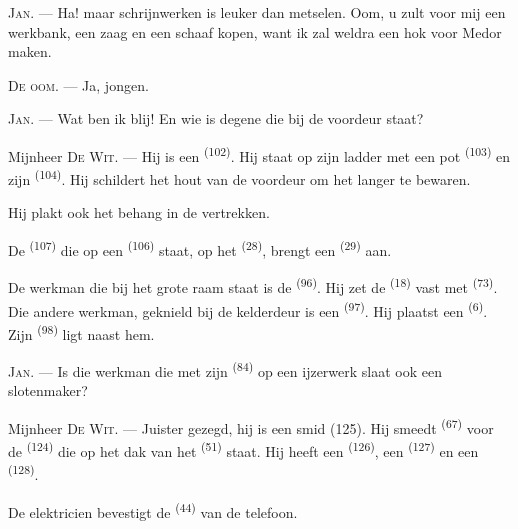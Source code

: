 \textsc{Jan}. --- Ha! maar schrijnwerken is leuker dan metselen. Oom, u zult voor mij een
werkbank, een zaag en een schaaf kopen, want ik zal weldra een hok voor Medor maken.

\textsc{De oom}. --- Ja, jongen.

\textsc{Jan}. --- Wat ben ik blij! En wie is degene die bij de voordeur staat?

\VUsaut{3.0mm}
\VUsaut{3.0mm}

Mijnheer \textsc{De Wit}. --- Hij is een  \textsuperscript{(102)}. Hij staat
op zijn ladder met een pot  \textsuperscript{(103)} en zijn 
\textsuperscript{(104)}. Hij schildert het hout van de voordeur om het langer te bewaren.

Hij plakt ook het behang in de vertrekken.

De  \textsuperscript{(107)} die op een 
\textsuperscript{(106)} staat, op het  \textsuperscript{(28)}, brengt een
 \textsuperscript{(29)} aan.

De werkman die bij het grote raam staat is de  \textsuperscript{(96)}. Hij
zet de  \textsuperscript{(18)} vast met 
\textsuperscript{(73)}. Die andere werkman, geknield bij de kelderdeur is een
 \textsuperscript{(97)}. Hij plaatst een 
\textsuperscript{(6)}. Zijn  \textsuperscript{(98)} ligt naast hem.

\textsc{Jan}. --- Is die werkman die met zijn  \textsuperscript{(84)} op een
ijzerwerk slaat ook een slotenmaker?

Mijnheer \textsc{De Wit}. --- Juister gezegd, hij is een smid (125). Hij smeedt
 \textsuperscript{(67)} voor de 
\textsuperscript{(124)} die op het dak van het  \textsuperscript{(51)}
staat. Hij heeft een  \textsuperscript{(126)}, een 
\textsuperscript{(127)} en een
 \textsuperscript{(128)}.

De elektricien bevestigt de  \textsuperscript{(44)}
 van de telefoon.

\VUsaut{3.0mm}

